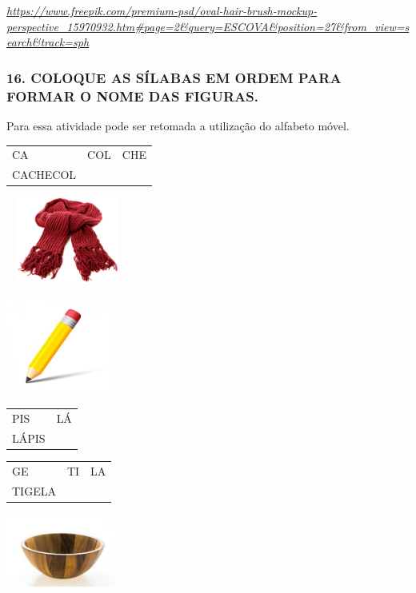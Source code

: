 \href{https://www.freepik.com/premium-psd/oval-hair-brush-mockup-perspective_15970932.htm\#page=2\&query=ESCOVA\&position=27\&from_view=search\&track=sph}{\emph{https://www.freepik.com/premium-psd/oval-hair-brush-mockup-perspective\_15970932.htm\#page=2\&query=ESCOVA\&position=27\&from\_view=search\&track=sph}}

\subsubsection{16. COLOQUE AS SÍLABAS EM ORDEM PARA FORMAR O NOME DAS
FIGURAS.}\label{coloque-as-suxedlabas-em-ordem-para-formar-o-nome-das-figuras.}

Para essa atividade pode ser retomada a utilização do alfabeto móvel.

\begin{longtable}[]{@{}lll@{}}
\toprule
CA & COL & CHE\tabularnewline
CACHECOL\tabularnewline
\bottomrule
\end{longtable}

\includegraphics[width=1.59418in,height=1.11488in]{media/image77.png}

\includegraphics[width=1.39583in,height=1.25000in]{media/image78.png}

\begin{longtable}[]{@{}ll@{}}
\toprule
PIS & LÁ\tabularnewline
LÁPIS\tabularnewline
\bottomrule
\end{longtable}

\begin{longtable}[]{@{}lll@{}}
\toprule
GE & TI & LA\tabularnewline
TIGELA\tabularnewline
\bottomrule
\end{longtable}

\includegraphics[width=1.41771in,height=0.94514in]{media/image79.jpg}

